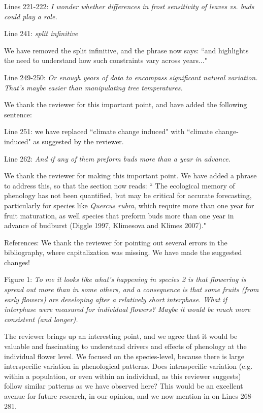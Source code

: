 \documentclass[10.95pt,a4paper]{letter}
\begin{document}
\par Lines 221-222: \emph{I wonder whether differences in frost sensitivity of leaves vs. buds could play a role. }

\par Line 241: \emph{split infinitive}
\par We have removed the split infinitive, and the phrase now says: ``and highlights the need to understand how such constraints vary across years..."

\par Line 249-250: \emph{Or enough years of data to encompass significant natural variation.  That's maybe easier than manipulating tree temperatures.}
\par We thank the reviewer for this important point, and have added the following sentence:
\par Line 251: we have replaced ``climate change induced" with ``climate change-induced" as suggested by the reviewer.
\\
\par Line 262: \emph{And if any of them preform buds more than a year in advance.}
\par We thank the reviewer for making this important point. We have added a phrase to address this, so that the section now reads:
`` The ecological memory of phenology has not been quantified, but may be critical for accurate forecasting, particularly for species like \emph{Quercus rubra}, which require more than one year for fruit maturation, as well species that preform buds more than one year in advance of budburst (Diggle 1997, Klimesova and Klimes 2007)." 
\\
\par References: We thank the reviewer for pointing out several errors in the bibliography, where capitalization was missing. We have made the suggested changes!
\\
\par Figure 1: \emph{To me it looks like what's happening in species 2 is that flowering is spread out more than in some others, and a consequence is that some fruits (from early flowers) are developing after a relatively short interphase.  What if interphase were measured for individual flowers?  Maybe it would be much more consistent (and longer).}
\par The reviewer brings up an interesting point, and we agree that it would be valuable and fascinating to understand drivers and effects of phenology at the individual flower level. We focused on the species-level, because there is large interspecific variation in phenological patterns. Does intraspecific variation (e.g. within a population, or even within an individual, as this reviewer suggests) follow similar patterns as we have observed here? This would be an excellent avenue for future research, in our opinion, and we now mention in on Lines 268-281.
\end{document}
